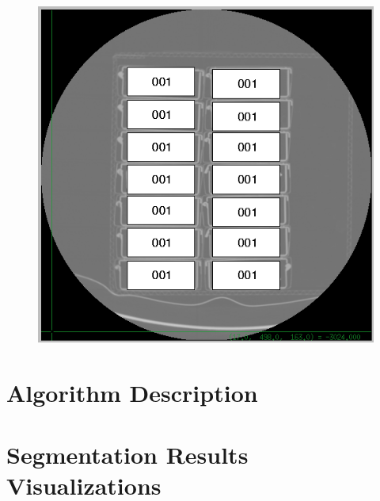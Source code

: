 \documentclass{InsightArticle}
\begin{document}
\begin{figure}
\center
\includegraphics[width=1.0\textwidth]{NIST_A_Catalog.png}
\label{fig:StackCatalog}
\end{figure}
\clearpage


\section{Algorithm Description}

\section{Segmentation Results Visualizations}


\small
\listoffigures
\listoftables
\normalsize
\end{document}
